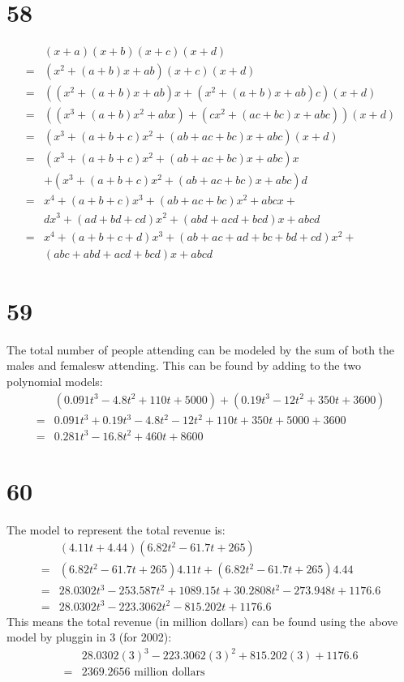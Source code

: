 \documentclass{article}
\theoremstyle{definition}
\begin{document}
\section*{58}
\[
\begin{array}{rl}
	& (x+a)(x+b)(x+c)(x+d) \\
=	& (x^2+(a+b)x+ab)(x+c)(x+d) \\
=	& ((x^2+(a+b)x+ab)x+(x^2+(a+b)x+ab)c)(x+d) \\
=	& ((x^3+(a+b)x^2+abx)+(cx^2+(ac+bc)x+abc))(x+d) \\
=	& (x^3+(a+b+c)x^2+(ab+ac+bc)x+abc)(x+d) \\
=	& (x^3+(a+b+c)x^2+(ab+ac+bc)x+abc)x\\
	& +(x^3+(a+b+c)x^2+(ab+ac+bc)x+abc)d \\
=	& x^4+(a+b+c)x^3+(ab+ac+bc)x^2+abcx+ \\
	& dx^3+(ad+bd+cd)x^2+(abd+acd+bcd)x+abcd \\
=	& x^4+(a+b+c+d)x^3+(ab+ac+ad+bc+bd+cd)x^2+ \\
	& (abc+abd+acd+bcd)x+abcd
\end{array}
\]

\section*{59}
The total number of people attending can be modeled by the sum of both the males and femalesw attending. This can be found by adding to the two 
polynomial models:
\[
\begin{array}{rl}
	& (0.091t^3-4.8t^2+110t+5000)+(0.19t^3-12t^2+350t+3600) \\
=	& 0.091t^3+0.19t^3-4.8t^2-12t^2+110t+350t+5000+3600 \\
=	& 0.281t^3-16.8t^2+460t+8600
\end{array}
\]

\section*{60}
The model to represent the total revenue is: 
\[
\begin{array}{rl}
	& (4.11t+4.44)(6.82t^2-61.7t+265) \\
=	& (6.82t^2-61.7t+265)4.11t+(6.82t^2-61.7t+265)4.44 \\
=	& 28.0302t^3-253.587t^2+1089.15t+30.2808t^2-273.948t+1176.6 \\
=	& 28.0302t^3-223.3062t^2-815.202t+1176.6
\end{array}
\]
This means the total revenue (in million dollars) can be found using the above model by pluggin in $3$ (for 2002):
\[
\begin{array}{rl}
	& 28.0302(3)^3-223.3062(3)^2+815.202(3)+1176.6 \\
=	&  2369.2656 \textrm{ million dollars}
\end{array}
\]
\end{document}
